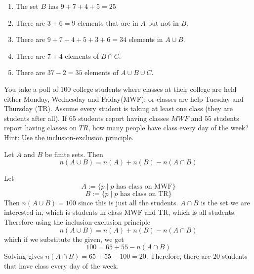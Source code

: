 \documentclass[addpoints,12pt]{exam}
\begin{document}
\begin{questions}
\begin{center}
\end{center}

\begin{solution}
    \begin{enumerate}[label = \alph*)]
			\item The set $B$ has $9+7+4+5 = 25$
			\item There are $3+6=9$ elements that are in $A$ but not in $B$. 
			\item There are $9+7+4+5+3+6 = 34$  elements in $A\cup B$. 
			\item There are $7+4$ elements of $B\cap C$. 
			\item There are $37-2=35$ elements of $A\cup B\cup C$. 
    \end{enumerate}
\end{solution}

\newpage
\question You take a poll of $100$ college students where classes at their college are held either Monday, Wednesday and Friday(MWF), or classes are help Tuesday and Thursday (TR). Assume every student is taking at least one class (they are students after all). If $65$ students report having classes $MWF$ and $55$ students report having classes on $TR$, how many people have class every day of the week? Hint: Use the inclusion-exclusion principle. 

\begin{theorem}
    Let $A$ and $B$ be finite sets. Then 
		\[
		n(A\cup B) = n(A)+n(B)-n(A\cap B)
		\]
\end{theorem}

\begin{solution}
	Let 
	\[
	A := \{p\mid p \text{ has class on MWF}\}
	\]
	\[
	B := \{p\mid p \text{ has class on TR}\}
	\]
	Then $n(A\cup B) = 100$ since this is just all the students. $A\cap B$ is the set we are interested in, which is students in class MWF and TR, which is all students. Therefore using the inclusion-exclusion principle
	\[
	n(A\cup B) = n(A)+n(B)-n(A\cap B)
	\]
	which if we substitute the given, we get 
	\[
	100 = 65+55 - n(A\cap B)
	\]
	Solving gives $n(A\cap B) = 65+55-100=20$. Therefore, there are $20$ students that have class every day of the week. 
    

\end{solution}
\end{questions}
\end{document}
